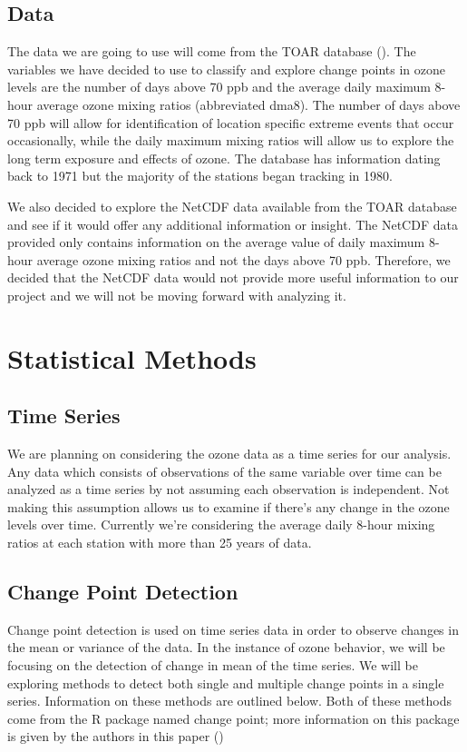 \documentclass[11pt, oneside]{article}
\theoremstyle{definition}
\begin{document}
\subsection{Data}
The data we are going to use will come from the TOAR database (\cite{schultz2017apmd}). The variables we have decided to use to classify and explore change points in ozone levels are the number of days above 70 ppb and the average daily maximum 8-hour average ozone mixing ratios (abbreviated dma8). The number of days above 70 ppb will allow for identification of location specific extreme events that occur occasionally, while the daily maximum mixing ratios will allow us to explore the long term exposure and effects of ozone. The database has information dating back to 1971 but the majority of the stations began tracking in 1980.

We also decided to explore the NetCDF data available from the TOAR database and see if it would offer any additional information or insight. The NetCDF data provided only contains information on the average value of daily maximum 8-hour average ozone mixing ratios and not the days above 70 ppb. Therefore, we decided that the NetCDF data would not provide more useful information to our project and we will not be moving forward with analyzing it. 

\section{Statistical Methods}
\subsection{Time Series}
We are planning on considering the ozone data as a time series for our analysis. Any data which consists of observations of the same variable over time can be analyzed as a time series by not assuming each observation is independent. Not making this assumption allows us to examine if there's any change in the ozone levels over time. Currently we're considering the average daily 8-hour mixing ratios at each station with more than 25 years of data.

\subsection{Change Point Detection}
Change point detection is used on time series data in order to observe changes in the mean or variance of the data. In the instance of ozone behavior, we will be focusing on the detection of change in mean of the time series. We will be exploring methods to detect both single and multiple change points in a single series. Information on these methods are outlined below. Both of these methods come from the R package named change point; more information on this package is given by the authors in this paper (\cite{changepoint})
\end{document}
